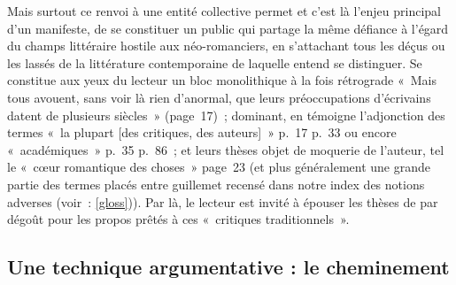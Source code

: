 \documentclass[12pt, a4paper]{article}
\begin{document}
Mais surtout ce renvoi à une entité collective permet et c'est là l'enjeu principal d'un manifeste, de se constituer un public qui partage la même défiance à l'égard du champs littéraire hostile aux néo-romanciers, en s'attachant tous les déçus ou les lassés de la littérature contemporaine de laquelle \robbe{} entend se distinguer. Se constitue aux yeux du lecteur un bloc monolithique à la fois rétrograde «~Mais tous avouent, sans voir là rien d’anormal, que leurs préoccupations d’écrivains datent de plusieurs siècles~» (page~17)~; dominant, en témoigne l'adjonction des termes «~la plupart [des critiques, des auteurs]~» p.~17 p.~33 ou encore «~académiques~» p.~35 p.~86~; et leurs thèses objet de moquerie de l'auteur, tel le «~cœur romantique des choses~» page~23 (et plus généralement une grande partie des termes placés entre guillemet recensé dans notre index des notions adverses (voir~: \ref{gloss})). Par là, le lecteur est invité à épouser les thèses de \punr{} par dégoût pour les propos prêtés à ces «~critiques traditionnels~».





\subsection{Une technique argumentative : le cheminement}
\label{rhétoChemin}

\end{document}
